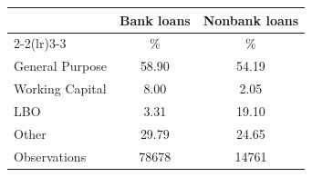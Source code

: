 {
\def\sym#1{\ifmmode^{#1}\else\(^{#1}\)\fi}
\begin{tabular}{l*{2}{c}}
\hline\hline
                    &\multicolumn{1}{c}{Bank loans}                              &\multicolumn{1}{c}{Nonbank loans}                           \\\cmidrule(lr){2-2}\cmidrule(lr){3-3}
                    &                                                          \%&                                                          \%\\
\hline
General Purpose     &                                                       58.90&                                                       54.19\\
Working Capital     &                                                        8.00&                                                        2.05\\
LBO                 &                                                        3.31&                                                       19.10\\
Other               &                                                       29.79&                                                       24.65\\
\hline
Observations        &                                                       78678&                                                       14761\\
\hline\hline
\end{tabular}
}
